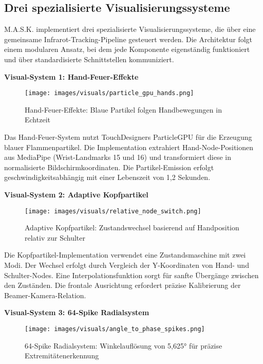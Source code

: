 \subsection{Drei spezialisierte Visualisierungssysteme}

M.A.S.K. implementiert drei spezialisierte Visualisierungssysteme, die über eine gemeinsame Infrarot-Tracking-Pipeline gesteuert werden. Die Architektur folgt einem modularen Ansatz, bei dem jede Komponente eigenständig funktioniert und über standardisierte Schnittstellen kommuniziert.

\textbf{Visual-System 1: Hand-Feuer-Effekte}

\begin{figure}[h]
    \centering
    \texttt{[image: images/visuals/particle\_gpu\_hands.png]}
    \caption{Hand-Feuer-Effekte: Blaue Partikel folgen Handbewegungen in Echtzeit}
    \label{fig:particle_hands}
\end{figure}

Das Hand-Feuer-System nutzt TouchDesigners ParticleGPU für die Erzeugung blauer Flammenpartikel. Die Implementation extrahiert Hand-Node-Positionen aus MediaPipe (Wrist-Landmarks 15 und 16) und transformiert diese in normalisierte Bildschirmkoordinaten. Die Partikel-Emission erfolgt geschwindigkeitsabhängig mit einer Lebenszeit von 1,2 Sekunden.

\textbf{Visual-System 2: Adaptive Kopfpartikel}

\begin{figure}[h]
    \centering
    \texttt{[image: images/visuals/relative\_node\_switch.png]}
    \caption{Adaptive Kopfpartikel: Zustandswechsel basierend auf Handposition relativ zur Schulter}
    \label{fig:relative_switch}
\end{figure}

Die Kopfpartikel-Implementation verwendet eine Zustandsmaschine mit zwei Modi. Der Wechsel erfolgt durch Vergleich der Y-Koordinaten von Hand- und Schulter-Nodes. Eine Interpolationsfunktion sorgt für sanfte Übergänge zwischen den Zuständen. Die frontale Ausrichtung erfordert präzise Kalibrierung der Beamer-Kamera-Relation.

\textbf{Visual-System 3: 64-Spike Radialsystem}

\begin{figure}[h]
    \centering
    \texttt{[image: images/visuals/angle\_to\_phase\_spikes.png]}
    \caption{64-Spike Radialsystem: Winkelauflösung von 5,625° für präzise Extremitätenerkennung}
    \label{fig:spike_system}
\end{figure}

